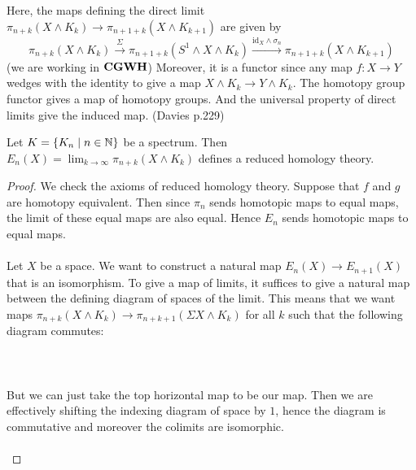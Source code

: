 \documentclass[a4paper]{article}
\begin{document}
Here, the maps defining the direct limit $\pi_{n+k}(X\wedge K_k)\to\pi_{n+1+k}(X\wedge K_{k+1})$ are given by $$\pi_{n+k}(X\wedge K_k)\overset{\Sigma}{\rightarrow}\pi_{n+1+k}(S^1\wedge X\wedge K_k)\overset{\text{id}_X\wedge\sigma_n}{\rightarrow}\pi_{n+1+k}(X\wedge K_{k+1})$$ (we are working in $\bold{CGWH}$) Moreover, it is a functor since any map $f:X\to Y$ wedges with the identity to give a map $X\wedge K_k\to Y\wedge K_k$. The homotopy group functor gives a map of homotopy groups. And the universal property of direct limits give the induced map. (Davies p.229)

\begin{thm}{}{} Let $K=\{K_n\;|\;n\in\mathbb{N}\}$ be a spectrum. Then $E_n(X)=\lim_{k\to\infty}\pi_{n+k}(X\wedge K_k)$ defines a reduced homology theory. \tcbline
\begin{proof}
We check the axioms of reduced homology theory. Suppose that $f$ and $g$ are homotopy equivalent. Then since $\pi_n$ sends homotopic maps to equal maps, the limit of these equal maps are also equal. Hence $E_n$ sends homotopic maps to equal maps. \\~\\

Let $X$ be a space. We want to construct a natural map $E_n(X)\to E_{n+1}(X)$ that is an isomorphism. To give a map of limits, it suffices to give a natural map between the defining diagram of spaces of the limit. This means that we want maps $\pi_{n+k}(X\wedge K_k)\to\pi_{n+k+1}(\Sigma X\wedge K_k)$ for all $k$ such that the following diagram commutes: \\~\\
\\~\\
But we can just take the top horizontal map to be our map. Then we are effectively shifting the indexing diagram of space by $1$, hence the diagram is commutative and moreover the colimits are isomorphic. \\~\\


\end{proof}
\end{thm}
\end{document}
